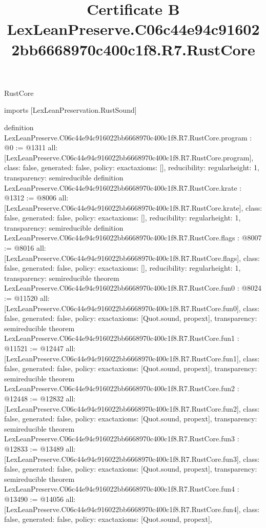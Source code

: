 \begin{lexlean}{RustCore}
\title{Certificate B LexLeanPreserve.C06c44e94c916022bb6668970c400c1f8.R7.RustCore}
\begin{coremodule}
imports [LexLeanPreservation.RustSound]

definition LexLeanPreserve.C06c44e94c916022bb6668970c400c1f8.R7.RustCore.program : @0 := @1311 {
  all: [LexLeanPreserve.C06c44e94c916022bb6668970c400c1f8.R7.RustCore.program],
  class: false,
  generated: false,
  policy: exact{axioms: []},
  reducibility: regular{height: 1},
  transparency: semireducible
}
definition LexLeanPreserve.C06c44e94c916022bb6668970c400c1f8.R7.RustCore.krate : @1312 := @8006 {
  all: [LexLeanPreserve.C06c44e94c916022bb6668970c400c1f8.R7.RustCore.krate],
  class: false,
  generated: false,
  policy: exact{axioms: []},
  reducibility: regular{height: 1},
  transparency: semireducible
}
definition LexLeanPreserve.C06c44e94c916022bb6668970c400c1f8.R7.RustCore.flags : @8007 := @8016 {
  all: [LexLeanPreserve.C06c44e94c916022bb6668970c400c1f8.R7.RustCore.flags],
  class: false,
  generated: false,
  policy: exact{axioms: []},
  reducibility: regular{height: 1},
  transparency: semireducible
}
theorem LexLeanPreserve.C06c44e94c916022bb6668970c400c1f8.R7.RustCore.fun0 : @8024 := @11520 {
  all: [LexLeanPreserve.C06c44e94c916022bb6668970c400c1f8.R7.RustCore.fun0],
  class: false,
  generated: false,
  policy: exact{axioms: [Quot.sound, propext]},
  transparency: semireducible
}
theorem LexLeanPreserve.C06c44e94c916022bb6668970c400c1f8.R7.RustCore.fun1 : @11521 := @12447 {
  all: [LexLeanPreserve.C06c44e94c916022bb6668970c400c1f8.R7.RustCore.fun1],
  class: false,
  generated: false,
  policy: exact{axioms: [Quot.sound, propext]},
  transparency: semireducible
}
theorem LexLeanPreserve.C06c44e94c916022bb6668970c400c1f8.R7.RustCore.fun2 : @12448 := @12832 {
  all: [LexLeanPreserve.C06c44e94c916022bb6668970c400c1f8.R7.RustCore.fun2],
  class: false,
  generated: false,
  policy: exact{axioms: [Quot.sound, propext]},
  transparency: semireducible
}
theorem LexLeanPreserve.C06c44e94c916022bb6668970c400c1f8.R7.RustCore.fun3 : @12833 := @13489 {
  all: [LexLeanPreserve.C06c44e94c916022bb6668970c400c1f8.R7.RustCore.fun3],
  class: false,
  generated: false,
  policy: exact{axioms: [Quot.sound, propext]},
  transparency: semireducible
}
theorem LexLeanPreserve.C06c44e94c916022bb6668970c400c1f8.R7.RustCore.fun4 : @13490 := @14056 {
  all: [LexLeanPreserve.C06c44e94c916022bb6668970c400c1f8.R7.RustCore.fun4],
  class: false,
  generated: false,
  policy: exact{axioms: [Quot.sound, propext]},
}
\end{coremodule}
\end{lexlean}
